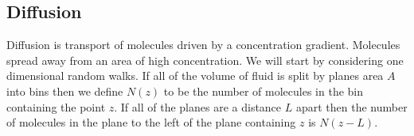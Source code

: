 \documentclass{article}
\begin{document}
    \subsection{Diffusion}
    Diffusion is transport of molecules driven by a concentration gradient.
    Molecules spread away from an area of high concentration.
    We will start by considering one dimensional random walks.
    If all of the volume of fluid is split by planes area \(A\) into bins then we define \(N(z)\) to be the number of molecules in the bin containing the point \(z\).
    If all of the planes are a distance \(L\) apart then the number of molecules in the plane to the left of the plane containing \(z\) is \(N(z - L)\).
    \begin{figure}[ht]
        \centering
\end{figure}
\end{document}

